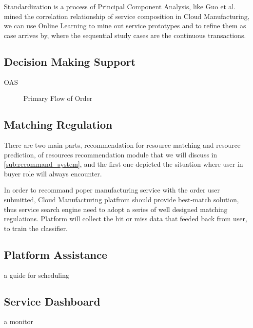 Standardization is a process of Principal Component Analysis, like Guo et al.\cite{Guo2011} mined the correlation relationship of service composition in Cloud Manufacturing, we can use Online Learning\cite{Shalev-Shwartz2011} to mine out service prototypes and to refine them as case arrives by, where the sequential study cases are the continuous transactions.

\subsection{Decision Making Support} %
\label{sub:decision_making_support}

OAS  
\begin{figure}[!h]
\caption{Primary Flow of Order}
\label{fig:orderflow}
\end{figure}


\subsection{Matching Regulation} %
\label{sub:matching_regulation}
There are two main parts, recommendation for resource matching and resource prediction, of resources recommendation module that we will discuss in \autoref{sub:recommand_system}, and the first one depicted the situation where user in buyer role will always encounter.

In order to recommand poper manufacturing service with the order user submitted, Cloud Manufacturing platfrom should provide best-match solution, thus service search engine need to adopt a series of well designed matching regulations. Platform will collect the hit or miss data that feeded back from user, to train the classifier.

\subsection{Platform Assistance} %
\label{sub:platform_assistance}
a guide for scheduling 

\subsection{Service Dashboard} %
\label{sub:service_dashboard}
a monitor
